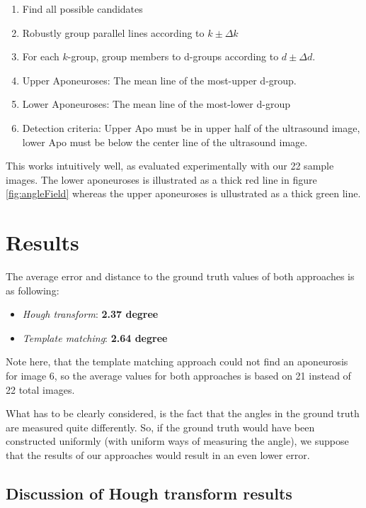\documentclass[10pt,twocolumn,letterpaper]{article}
\begin{document}
\begin{enumerate}
	\item Find all possible candidates
	\item Robustly group parallel lines according to $k \pm \Delta k$
	\item For each $k$-group, group members to d-groups according to $d \pm \Delta d$.
	\item Upper Aponeuroses: The mean line of the most-upper d-group.
	\item Lower Aponeuroses: The mean line of the most-lower d-group  
	\item Detection criteria: Upper Apo must be in upper half of the ultrasound image, lower Apo must be below the center line of the ultrasound image. 
\end{enumerate}

This works intuitively well, as evaluated experimentally with our 22 sample images. The lower aponeuroses is illustrated as a thick red line in figure \ref{fig:angleField} whereas the upper aponeuroses is ullustrated as a thick green line.





\section{Results}
The average error and distance to the ground truth values of both approaches is as following: 

\begin{itemize}
     \item \emph{Hough transform}: \textbf{2.37 degree}
     \item \emph{Template matching}: \textbf{2.64 degree}
\end{itemize}

Note here, that the template matching approach could not find an aponeurosis for image 6, so the average values for both approaches is based on 21 instead of 22 total images.

What has to be clearly considered, is the fact that the angles in the ground truth are measured quite differently. So, if the ground truth would have been constructed uniformly (with uniform ways of measuring the angle), we suppose that the results of our approaches would result in an even lower error.


\subsection{Discussion of Hough transform results}
\end{document}
